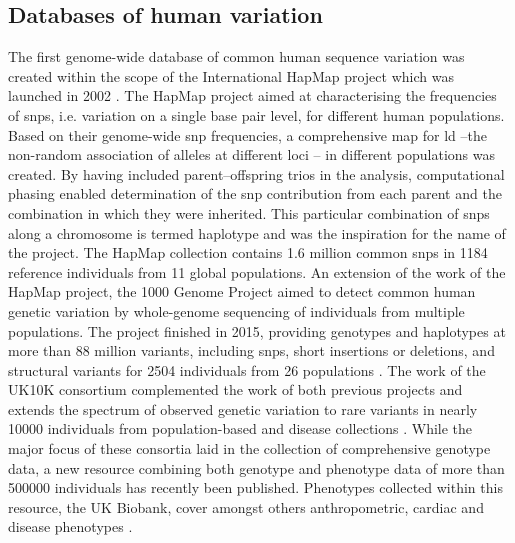 \subsection{Databases of human variation}
\label{subsection:databases}
The first genome-wide database of common human sequence variation was created within the scope of the International HapMap project which was launched in 2002 \citep{HapMap2005,HapMap2007,HapMap2010}.
The HapMap project aimed at characterising the frequencies of \glspl{snp}, i.e. variation on a single base pair level, for different human populations. Based on their genome-wide \gls{snp} frequencies, a comprehensive map for \gls{ld}  --the non-random association of alleles at different loci \citep{Lewontin1960}-- in different populations was created. By having included parent–offspring trios in the analysis, computational phasing \citep{Stephens2001} enabled determination of the \gls{snp} contribution from each parent and the combination in which they were inherited. This particular combination of \glspl{snp} along a chromosome is termed haplotype and was the inspiration for the name of the project. The HapMap collection contains 1.6 million common \glspl{snp} in \num{1184} reference individuals from 11 global populations. An extension of the work of the HapMap project, the 1000 Genome Project aimed to detect common human genetic variation by whole-genome sequencing of individuals from multiple populations. The project finished in 2015, providing genotypes and haplotypes at more than 88 million variants, including \glspl{snp}, short insertions or deletions, and structural variants for \num{2504} individuals from 26 populations \citep{1000Genomes2011,1000Genomes2012,1000Genomes2015}. The work of the UK10K consortium complemented the work of both previous projects and extends the spectrum of observed genetic variation to rare variants in nearly \num{10000} individuals from population-based and disease collections \citep{UK10KConsortium2015}. While the major focus of these consortia laid in the collection of comprehensive genotype data, a new resource combining both genotype and phenotype data of more than \num{500000} individuals has recently been published. Phenotypes collected within this resource, the UK Biobank, cover amongst others anthropometric, cardiac and disease phenotypes \citep{Sudlow2015}.

